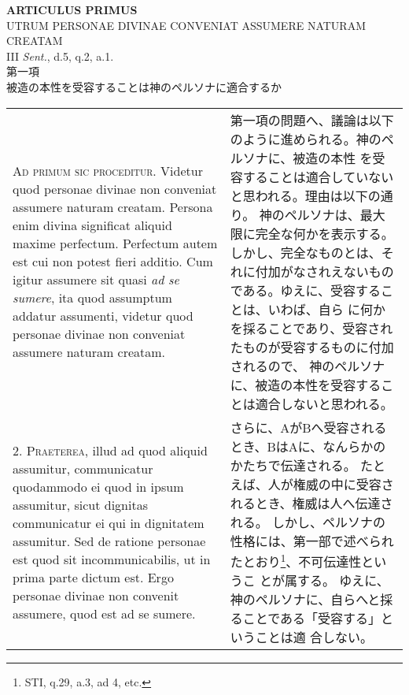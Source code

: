 \documentclass[10pt]{jsarticle} %
\begin{document}
\begin{center}
 {\Large {\bf ARTICULUS PRIMUS}}\\
 {\large UTRUM PERSONAE DIVINAE CONVENIAT ASSUMERE NATURAM CREATAM}\\
 {\footnotesize III {\itshape Sent.}, d.5, q.2, a.1.}\\
 {\Large 第一項\\被造の本性を受容することは神のペルソナに適合するか}
\end{center}

\begin{longtable}{p{21em}p{21em}}




{\scshape Ad primum sic proceditur}. Videtur quod personae divinae non conveniat
assumere naturam creatam. Persona enim divina significat aliquid maxime
perfectum. Perfectum autem est cui non potest fieri additio. Cum igitur
assumere sit quasi {\itshape ad se sumere}, ita quod assumptum addatur assumenti,
videtur quod personae divinae non conveniat assumere naturam creatam.


&


第一項の問題へ、議論は以下のように進められる。神のペルソナに、被造の本性
 を受容することは適合していないと思われる。理由は以下の通り。
神のペルソナは、最大限に完全な何かを表示する。しかし、完全なものとは、そ
 れに付加がなされえないものである。ゆえに、受容することは、いわば、自ら
 に何かを採ることであり、受容されたものが受容するものに付加されるので、
 神のペルソナに、被造の本性を受容することは適合しないと思われる。

\\



2. {\scshape Praeterea}, illud ad quod aliquid assumitur, communicatur quodammodo ei
quod in ipsum assumitur, sicut dignitas communicatur ei qui in
dignitatem assumitur. Sed de ratione personae est quod sit
incommunicabilis, ut in prima parte dictum est. Ergo personae divinae
non convenit assumere, quod est ad se sumere.


&

さらに、AがBへ受容されるとき、BはAに、なんらかのかたちで伝達される。
たとえば、人が権威の中に受容されるとき、権威は人へ伝達される。
しかし、ペルソナの性格には、第一部で述べられたとおり\footnote{STI, q.29,
 a.3, ad 4, etc.}、不可伝達性というこ
 とが属する。
ゆえに、神のペルソナに、自らへと採ることである「受容する」ということは適
 合しない。

\\




\end{longtable}
\end{document}

